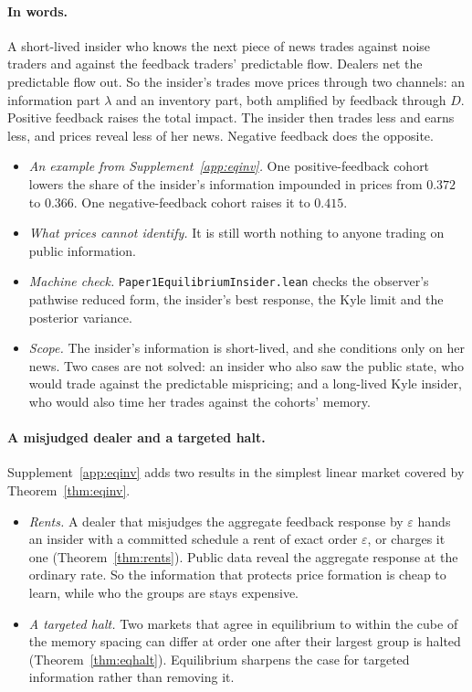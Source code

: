 \paragraph{In words.} A short-lived insider who knows the next piece of news trades against noise traders and against the feedback traders' predictable flow. Dealers net the predictable flow out. So the insider's trades move prices through two channels: an information part $\lambda$ and an inventory part, both amplified by feedback through $D$. Positive feedback raises the total impact. The insider then trades less and earns less, and prices reveal less of her news. Negative feedback does the opposite.
\begin{itemize}[itemsep=1pt,topsep=2pt]
\item \emph{An example from Supplement~\ref{app:eqinv}.} One positive-feedback cohort lowers the share of the insider's information impounded in prices from $0.372$ to $0.366$. One negative-feedback cohort raises it to $0.415$.
\item \emph{What prices cannot identify.} It is still worth nothing to anyone trading on public information.
\item \emph{Machine check.} \nolinkurl{Paper1EquilibriumInsider.lean} checks the observer's pathwise reduced form, the insider's best response, the Kyle limit and the posterior variance.
\item \emph{Scope.} The insider's information is short-lived, and she conditions only on her news. Two cases are not solved: an insider who also saw the public state, who would trade against the predictable mispricing; and a long-lived Kyle insider, who would also time her trades against the cohorts' memory.
\end{itemize}

\paragraph{A misjudged dealer and a targeted halt.} Supplement~\ref{app:eqinv} adds two results in the simplest linear market covered by Theorem~\ref{thm:eqinv}.
\begin{itemize}[itemsep=1pt,topsep=2pt]
\item \emph{Rents.} A dealer that misjudges the aggregate feedback response by $\varepsilon$ hands an insider with a committed schedule a rent of exact order $\varepsilon$, or charges it one (Theorem~\ref{thm:rents}). Public data reveal the aggregate response at the ordinary rate. So the information that protects price formation is cheap to learn, while who the groups are stays expensive.
\item \emph{A targeted halt.} Two markets that agree in equilibrium to within the cube of the memory spacing can differ at order one after their largest group is halted (Theorem~\ref{thm:eqhalt}). Equilibrium sharpens the case for targeted information rather than removing it.
\end{itemize}

